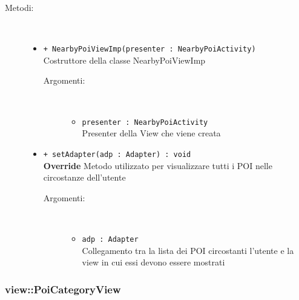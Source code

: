 \documentclass[../DefinizioneDiProdotto.tex]{subfiles}
\begin{document}
\begin{description}
\begin{itemize}
\end{itemize}
\item[Metodi:] \
\begin{itemize}
\item \texttt{+ NearbyPoiViewImp(presenter : NearbyPoiActivity)}\\
Costruttore della classe NearbyPoiViewImp
 \begin{description}
\item[Argomenti:] \
\begin{itemize}
\item \texttt{presenter : NearbyPoiActivity}\\
Presenter della View che viene creata\end{itemize}
\end{description}
\item \texttt{+ setAdapter(adp : Adapter) : void}\\
\textbf{Override} Metodo utilizzato per visualizzare tutti i POI nelle circostanze dell'utente
 \begin{description}
\item[Argomenti:] \
\begin{itemize}
\item \texttt{adp : Adapter}\\
Collegamento tra la lista dei POI circostanti l'utente e la view in cui essi devono essere mostrati\end{itemize}
\end{description}
\end{itemize}
\end{description}

\subsubsection{view::PoiCategoryView}
\end{document}
